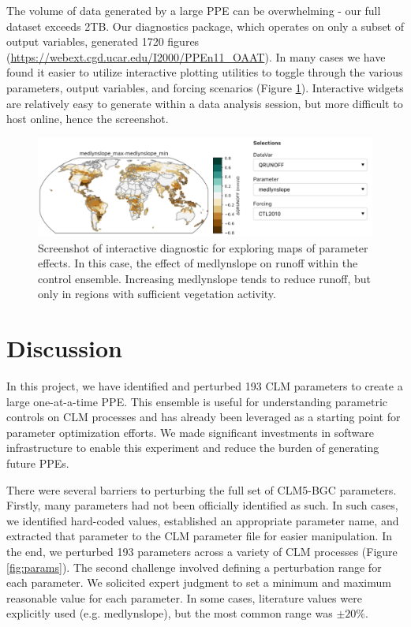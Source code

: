 \documentclass[draft]{agujournal2019}
\begin{document}
The volume of data generated by a large PPE can be overwhelming - our full dataset exceeds 2TB.  Our diagnostics package, which operates on only a subset of output variables, generated 1720 figures (\url{https://webext.cgd.ucar.edu/I2000/PPEn11_OAAT}). In many cases we have found it easier to utilize interactive plotting utilities to toggle through the various parameters, output variables, and forcing scenarios (Figure \ref{fig:panel}). Interactive widgets are relatively easy to generate within a data analysis session, but more difficult to host online, hence the screenshot.

\begin{figure}[h]
\centering
\includegraphics[width=\textwidth]{../figs/deltmap_panel.pdf}
\caption{Screenshot of interactive diagnostic for exploring maps of parameter effects. In this case, the effect of medlynslope on runoff within the control ensemble. Increasing medlynslope tends to reduce runoff, but only in regions with sufficient vegetation activity.}
\label{fig:panel}
\end{figure}

\section{Discussion}

In this project, we have identified and perturbed 193 CLM parameters to create a large one-at-a-time PPE. This ensemble is useful for understanding parametric controls on CLM processes and has already been leveraged as a starting point for parameter optimization efforts. We made significant investments in software infrastructure to enable this experiment and reduce the burden of generating future PPEs.

There were several barriers to perturbing the full set of CLM5-BGC parameters. Firstly, many parameters had not been officially identified as such. In such cases, we identified hard-coded values, established an appropriate parameter name, and extracted that parameter to the CLM parameter file for easier manipulation. In the end, we perturbed 193 parameters across a variety of CLM processes (Figure \ref{fig:params}). The second challenge involved defining a perturbation range for each parameter. We solicited expert judgment to set a minimum and maximum reasonable value for each parameter. In some cases, literature values were explicitly used (e.g. medlynslope), but the most common range was $\pm20\%$. 
\end{document}
